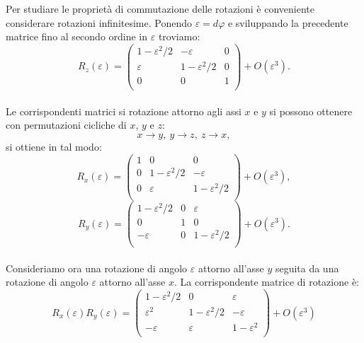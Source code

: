 \documentclass[a4paper,12pt,oneside]{book}
\begin{document}
Per studiare le proprietà di commutazione delle rotazioni è conveniente considerare rotazioni infinitesime. Ponendo $\varepsilon =d\varphi$ e sviluppando la precedente matrice fino al secondo ordine in $\varepsilon$ troviamo:
	\begin{equation}
		R_z (\varepsilon)=
		\begin{pmatrix}
			1-\varepsilon ^2 /2 & -\varepsilon & 0\\
			\varepsilon & 1-\varepsilon ^2/2 & 0 \\
			0 & 0 & 1 \\
		\end{pmatrix}
		+ O(\varepsilon ^3).
	\end{equation}\\
	
Le corrispondenti matrici si rotazione attorno agli assi $x$ e $y$ si possono ottenere con permutazioni cicliche di $x$, $y$ e $z$:
	\begin{equation}
		x\rightarrow y,\ y\rightarrow z,\ z\rightarrow x,
	\end{equation}
si ottiene in tal modo:
	\begin{equation}
		R_x (\varepsilon)=
		\begin{pmatrix}
			1 & 0 & 0\\
			0 & 1-\varepsilon ^2/2 & -\varepsilon \\
			0 & \varepsilon & 1-\varepsilon ^2/2 \\
		\end{pmatrix}
		+ O(\varepsilon ^3),
	\end{equation}
	\begin{equation}
		R_y (\varepsilon)=
		\begin{pmatrix}
			1-\varepsilon ^2/2 & 0 & \varepsilon\\
			0 & 1 &0 \\
			- \varepsilon & 0 & 1-\varepsilon ^2/2 \\
		\end{pmatrix}
		+ O(\varepsilon ^3).
	\end{equation}\\
	
Consideriamo ora una rotazione di angolo $\varepsilon$ attorno all'asse $y$ seguita da una rotazione di angolo $\varepsilon$ attorno all'asse $x$. La corrispondente matrice di rotazione è:
	\begin{equation}
		R_x (\varepsilon)R_y (\varepsilon)=
		\begin{pmatrix}
			1-\varepsilon ^2/2 & 0 & \varepsilon \\
			 \varepsilon ^2 & 1-\varepsilon ^2/2 & -\varepsilon \\
			-  \varepsilon & \varepsilon & 1-\varepsilon ^2 \\
		\end{pmatrix}
		+ O(\varepsilon ^3)
	\end{equation}\\
	
\end{document}
